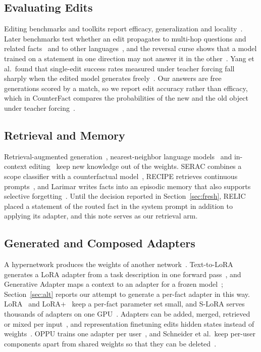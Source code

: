 \documentclass[journal,10pt]{IEEEtran}
\begin{document}
\subsection{Evaluating Edits}
Editing benchmarks and toolkits report efficacy, generalization and locality~\cite{yao2023editing,
wang2024easyedit}. Later benchmarks test whether an edit propagates to multi-hop questions and related
facts~\cite{zhong2023mquake,cohen2024ripple} and to other
languages~\cite{wang2024crosslingual,nie2025bmike}, and the reversal curse shows that a model trained on a
statement in one direction may not answer it in the other~\cite{berglund2024reversal}. Yang et al.\ found
that single-edit success rates measured under teacher forcing fall sharply when the edited model generates
freely~\cite{yang2025mirage}. Our answers are free generations scored by a match, so we report edit
accuracy rather than efficacy, which in CounterFact compares the probabilities of the new and the old
object under teacher forcing~\cite{meng2022rome}.

\subsection{Retrieval and Memory}
Retrieval-augmented generation~\cite{lewis2020rag}, nearest-neighbor language
models~\cite{khandelwal2020knnlm} and in-context editing~\cite{zheng2023ike} keep new knowledge out of the
weights. SERAC combines a scope classifier with a counterfactual model~\cite{mitchell2022serac}, RECIPE
retrieves continuous prompts~\cite{chen2024recipe}, and Larimar writes facts into an episodic memory that
also supports selective forgetting~\cite{das2024larimar}. Until the decision reported in
Section~\ref{sec:fresh}, RELIC placed a statement of the routed fact in the system prompt in addition to
applying its adapter, and this note serves as our retrieval arm.

\subsection{Generated and Composed Adapters}
A hypernetwork produces the weights of another network~\cite{ha2017hypernetworks}. Text-to-LoRA generates
a LoRA adapter from a task description in one forward pass~\cite{charakorn2025t2l}, and Generative Adapter
maps a context to an adapter for a frozen model~\cite{chen2025generative}; Section~\ref{sec:alt} reports
our attempt to generate a per-fact adapter in this way. LoRA~\cite{hu2022lora} and
LoRA+~\cite{hayou2024loraplus} keep a per-fact parameter set small, and S-LoRA serves thousands of
adapters on one GPU~\cite{sheng2024slora}. Adapters can be added, merged, retrieved or mixed per
input~\cite{ilharco2023taskarithmetic,yadav2023ties,huang2024lorahub,zhao2024loraretriever,wu2024mole},
and representation finetuning edits hidden states instead of weights~\cite{wu2024reft}. OPPU trains one
adapter per user~\cite{tan2024oppu}, and Schneider et al.\ keep per-user components apart from shared
weights so that they can be deleted~\cite{schneider2026separable}.
\end{document}
